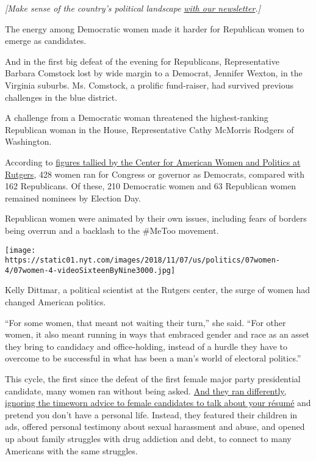 \emph{{[}Make sense of the country's political landscape}
\emph{\href{https://www.nytimes.com/newsletters/politics?smid=rd\%3Faction\%3Dclick\&module=inline\&pgtype=Article}{with
our newsletter}.{]}}

The energy among Democratic women made it harder for Republican women to
emerge as candidates.

And in the first big defeat of the evening for Republicans,
Representative Barbara Comstock lost by wide margin to a Democrat,
Jennifer Wexton, in the Virginia suburbs. Ms. Comstock, a prolific
fund-raiser, had survived previous challenges in the blue district.

A challenge from a Democratic woman threatened the highest-ranking
Republican woman in the House, Representative Cathy McMorris Rodgers of
Washington.

According to
\href{http://cawp.rutgers.edu/potential-candidate-summary-2018}{figures
tallied by the Center for American Women and Politics at Rutgers}, 428
women ran for Congress or governor as Democrats, compared with 162
Republicans. Of these, 210 Democratic women and 63 Republican women
remained nominees by Election Day.

Republican women were animated by their own issues, including fears of
borders being overrun and a backlash to the \#MeToo movement.

\texttt{[image: https://static01.nyt.com/images/2018/11/07/us/politics/07women-4/07women-4-videoSixteenByNine3000.jpg]}

Kelly Dittmar, a political scientist at the Rutgers center, the surge of
women had changed American politics.

``For some women, that meant not waiting their turn,'' she said. ``For
other women, it also meant running in ways that embraced gender and race
as an asset they bring to candidacy and office-holding, instead of a
hurdle they have to overcome to be successful in what has been a man's
world of electoral politics.''

This cycle, the first since the defeat of the first female major party
presidential candidate, many women ran without being asked.
\href{https://www.nytimes.com/2018/07/14/us/politics/women-candidates-midterms.html?fbclid=IwAR22W1gSst0XpyPVG9i_iuyqX6HZYBhWPVk6UOGo6_635Yv9_kNSwQS0Hg0}{And
they ran differently, ignoring the timeworn advice to female candidates
to talk about your résumé} and pretend you don't have a personal life.
Instead, they featured their children in ads, offered personal testimony
about sexual harassment and abuse, and opened up about family struggles
with drug addiction and debt, to connect to many Americans with the same
struggles.

